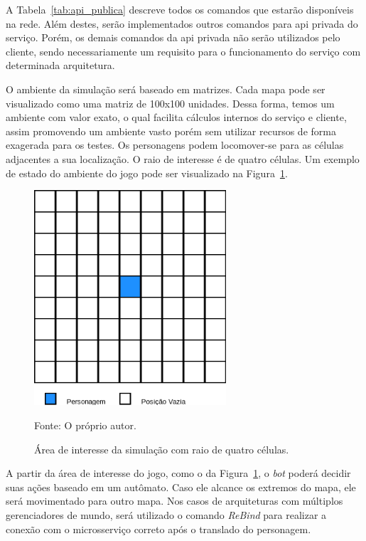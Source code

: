 A Tabela~\ref{tab:api_publica} descreve todos os comandos que estarão disponíveis na rede.
%
Além destes, serão implementados outros comandos para \ac{api} privada do serviço.
%
Porém, os demais comandos da \ac{api} privada não serão utilizados pelo cliente, sendo necessariamente um requisito para o funcionamento do serviço com determinada arquitetura.


O ambiente da simulação será baseado em matrizes.
%
Cada mapa pode ser visualizado como uma matriz de 100x100 unidades.
%
Dessa forma, temos um ambiente com valor exato, o qual facilita cálculos internos do serviço e cliente, assim promovendo um ambiente vasto porém sem utilizar recursos de forma exagerada para os testes.
%
Os personagens podem locomover-se para as células adjacentes a sua localização.
%
O raio de interesse é de quatro células.
%
Um exemplo de estado do ambiente do jogo pode ser visualizado na Figura~\ref{fig:roi}.

\begin{figure}[htb!]
  \caption{Área de interesse da simulação com raio de quatro células.}
  \label{fig:roi}
  \includegraphics[height=8.0cm]{img/cap3/roi.png}
  \centering

  Fonte: O próprio autor.
\end{figure}

A partir da área de interesse do jogo, como o da Figura~\ref{fig:roi}, o \textit{bot} poderá decidir suas ações baseado em um autômato.
%
Caso ele alcance os extremos do mapa, ele será movimentado para outro mapa.
%
Nos casos de arquiteturas com múltiplos gerenciadores de mundo, será utilizado o comando \textit{ReBind} para realizar a conexão com o microsserviço correto após o translado do personagem.



